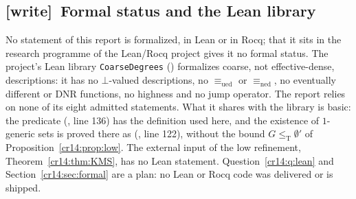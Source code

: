 \documentclass[11pt,a4paper]{article}
\newcommand{\leT}{\leq_{\mathrm T}}
\newcommand{\ned}{\mathrm{ned}}
\newcommand{\ued}{\mathrm{ued}}
\theoremstyle{definition}
\theoremstyle{remark}
\newcommand{\wtag}{\textup{[write]}}
\begin{document}
\subsection{\wtag\ Formal status and the Lean library}
\label{cr14:sec:wformal}
No statement of this report is formalized, in Lean or in Rocq; that it
sits in the research programme of the Lean/Rocq project
 gives it no formal status. The project's
Lean library \texttt{CoarseDegrees}
() formalizes coarse,
not effective-dense, descriptions: it has no $\bot$-valued descriptions, no
$\equiv_{\ued}$ or $\equiv_{\ned}$, no eventually different or DNR
functions, no highness and no jump operator. The report relies on none of
its eight admitted statements. What it shares with the library is basic:
the predicate  (, line 136) has the
definition used here, and the existence of $1$-generic sets is proved there
as  (, line 122), without the
bound $G\leT\emptyset'$ of Proposition~\ref{cr14:prop:low}. The external
input of the low refinement, Theorem~\ref{cr14:thm:KMS}, has no Lean
statement. Question~\ref{cr14:q:lean} and Section~\ref{cr14:sec:formal} are
a plan: no Lean or Rocq code was delivered or is shipped.
\end{document}
